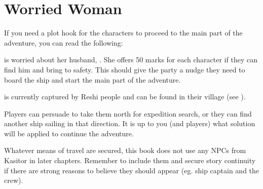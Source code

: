 \section{Worried Woman}

If you need a plot hook for the characters to proceed to the main part of the adventure, you can read the following:


\npcWorriedWife[s] is worried about her husband, \npcCapturedExplorer{}. She offers 50 marks for each character if they can find him and bring to safety. This should give the party a nudge they need to board the ship and start the main part of the adventure. 

\npcCapturedExplorer{} is currently captured by Reshi people and can be found in their village (see ).

Players can persuade \npcShinCaptain{} to take them north for expedition search, or they can find another ship sailing in that direction. It is up to you (and players) what solution will be applied to continue the adventure.

Whatever means of travel are secured, this book does not use any NPCs from Kasitor in later chapters. Remember to include them and secure story continuity if there are strong reasons to believe they should appear (eg. ship captain and the crew).




